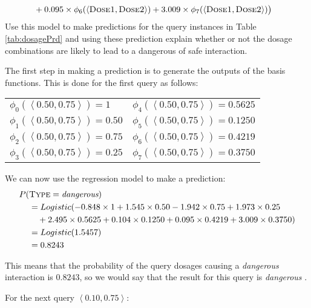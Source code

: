 \documentclass[--SOLUTION-OPTION--]{ditpaper}
\begin{document}
\begin{enumerate}
\begin{alignat*}{2}
  & + 0.095 \times\phi_6(\mathbf{\left<\textsc{Dose1}, \textsc{Dose2}\right>})
  + 3.009\times\phi_7(\mathbf{\left<\textsc{Dose1}, \textsc{Dose2}\right>})\big) 
\end{alignat*}
Use this model to make predictions for the query instances in Table \ref{tab:dosagePrd} and using these prediction explain whether or not the dosage combinations are likely to lead to a dangerous of safe interaction.
		\begin{answer}
	The first step in making a prediction is to generate the outputs of the basis functions. This is done for the first query as follows:
			\begin{center}
\begin{tabular}[ht]{ l  l  }
$\phi_0(\left<0.50, 0.75\right>) =  1$ & $\phi_4(\left<0.50, 0.75\right>) = 0.5625$ \\
$\phi_1(\left<0.50, 0.75\right>) = 0.50$ & $\phi_5(\left<0.50, 0.75\right>) = 0.1250$ \\
$\phi_2(\left<0.50, 0.75\right>) = 0.75$ &$\phi_6(\left<0.50, 0.75\right>) = 0.4219$  \\
$\phi_3(\left<0.50, 0.75\right>) = 0.25$ & $\phi_7(\left<0.50, 0.75\right>) = 0.3750$ \\
\end{tabular}
\end{center}
	We can now use the regression model to make a prediction:
		\begin{alignat*}{2}				
P(&\textsc{Type}=\textit{dangerous}) \\
& = Logistic(-0.848\times 1 + 1.545 \times0.50 -1.942 \times0.75 + 1.973 \times0.25 \\
& ~~~ +  2.495   \times 0.5625 + 0.104 \times 0.1250 + 0.095 \times 0.4219 + 3.009\times0.3750) \\
 & = Logistic(1.5457)  \\
 & = 0.8243 
\end{alignat*}

\noindent This means that the probability of the query dosages causing a \textit{dangerous} interaction is $0.8243$, so we would say that the result for this query is  \textit{dangerous} . 

For the next query $\left<0.10	,0.75\right>$:


\end{answer}
\end{enumerate}
\end{document}
